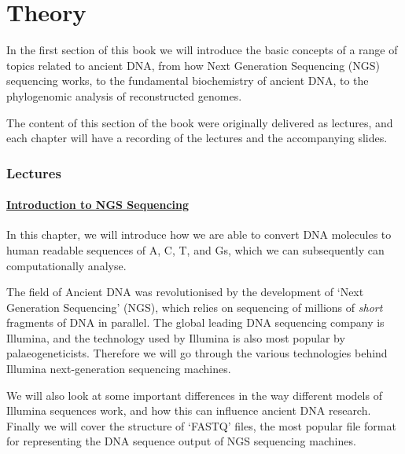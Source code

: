 \documentclass[
  letterpaper,
]{book}
\begin{document}
\part{Theory}

In the first section of this book we will introduce the basic concepts
of a range of topics related to ancient DNA, from how Next Generation
Sequencing (NGS) sequencing works, to the fundamental biochemistry of
ancient DNA, to the phylogenomic analysis of reconstructed genomes.

The content of this section of the book were originally delivered as
lectures, and each chapter will have a recording of the lectures and the
accompanying slides.

\hypertarget{lectures}{%
\section*{Lectures}\label{lectures}}


\hypertarget{introduction-to-ngs-sequencing}{%
\subsection*{\texorpdfstring{\protect\hyperlink{introduction-to-ngs-sequencing-1}{Introduction
to NGS
Sequencing}}{Introduction to NGS Sequencing}}\label{introduction-to-ngs-sequencing}}

In this chapter, we will introduce how we are able to convert DNA
molecules to human readable sequences of A, C, T, and Gs, which we can
subsequently can computationally analyse.

The field of Ancient DNA was revolutionised by the development of `Next
Generation Sequencing' (NGS), which relies on sequencing of millions of
\emph{short} fragments of DNA in parallel. The global leading DNA
sequencing company is Illumina, and the technology used by Illumina is
also most popular by palaeogeneticists. Therefore we will go through the
various technologies behind Illumina next-generation sequencing
machines.

We will also look at some important differences in the way different
models of Illumina sequences work, and how this can influence ancient
DNA research. Finally we will cover the structure of `FASTQ' files, the
most popular file format for representing the DNA sequence output of NGS
sequencing machines.
\end{document}
